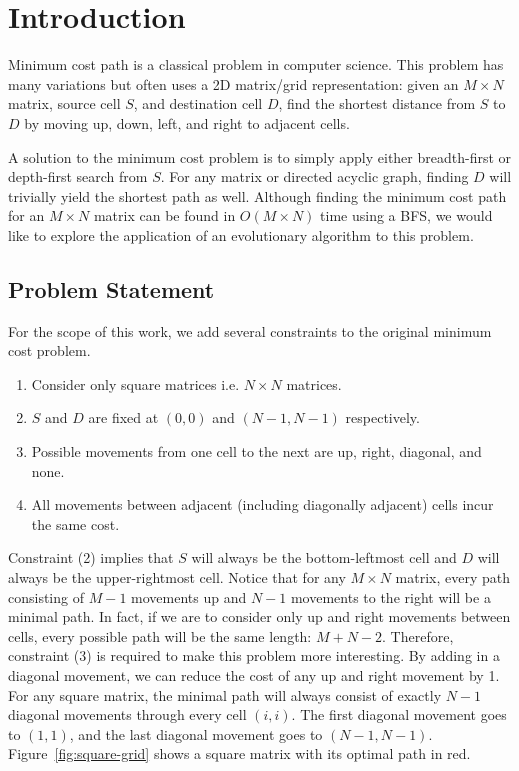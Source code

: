 
\section{Introduction}

Minimum cost path is a classical problem in computer science. This problem has many variations but often uses a 2D matrix/grid representation: given an $M \times N$ matrix, source cell $S$, and destination cell $D$, find the shortest distance from $S$ to $D$ by moving up, down, left, and right to adjacent cells.


A solution to the minimum cost problem is to simply apply either breadth-first or depth-first search from $S$. For any matrix or directed acyclic graph, finding $D$ will trivially yield the shortest path as well. Although finding the minimum cost path for an $M \times N$ matrix can be found in $O(M \times N)$ time using a BFS, we would like to explore the application of an evolutionary algorithm to this problem.

\subsection{Problem Statement}

 For the scope of this work, we add several constraints to the original minimum cost problem.
\begin{enumerate}
    \item Consider only square matrices i.e. $N \times N$ matrices.
    \item $S$ and $D$ are fixed at $(0, 0)$ and $(N-1, N-1)$ respectively. \label{two}
    \item Possible movements from one cell to the next are up, right, diagonal, and none.
    \item All movements between adjacent (including diagonally adjacent) cells incur the same cost.
\end{enumerate}

Constraint (2) implies that $S$ will always be the bottom-leftmost cell and $D$ will always be the upper-rightmost cell. Notice that for any $M \times N$ matrix, every path consisting of $M-1$ movements up and $N-1$ movements to the right will be a minimal path. In fact, if we are to consider only up and right movements between cells, every possible path will be the same length: $M + N - 2$. Therefore, constraint (3) is required to make this problem more interesting. By adding in a diagonal movement, we can reduce the cost of any up and right movement by 1. For any square matrix, the minimal path will always consist of exactly $N-1$ diagonal movements through every cell $(i, i)$. The first diagonal movement goes to $(1,1)$, and the last diagonal movement goes to $(N-1, N-1)$. Figure~\ref{fig:square-grid} shows a square matrix with its optimal path in red.

